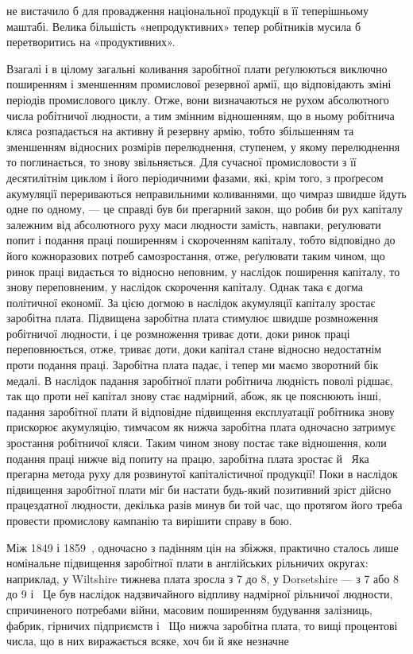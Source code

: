 \parcont{}  %
не вистачило б для провадження національної продукції в її
теперішньому маштабі. Велика більшість «непродуктивних»
тепер робітників мусила б перетворитись на «продуктивних».

Взагалі і в цілому загальні коливання заробітної плати реґулюються
виключно поширенням і зменшенням промислової резервної
армії, що відповідають зміні періодів промислового циклу.
Отже, вони визначаються не рухом абсолютного числа робітничої
людности, а тим змінним відношенням, що в ньому робітнича кляса
розпадається на активну й резервну армію, тобто збільшенням
та зменшенням відносних розмірів перелюднення, ступенем, у
якому перелюднення то поглинається, то знову звільняється.
Для сучасної промисловости з її десятилітнім циклом і його періодичними
фазами, які, крім того, з проґресом акумуляції перериваються
неправильними коливаннями, що чимраз швидше йдуть
одне по одному, — це справді був би прегарний закон, що робив
би рух капіталу залежним від абсолютного руху маси людности
замість, навпаки, реґулювати попит і подання праці поширенням
і скороченням капіталу, тобто відповідно до його кожноразових
потреб самозростання, отже, реґулювати таким чином,
що ринок праці видається то відносно неповним, у наслідок
поширення капіталу, то знову переповненим, у наслідок скорочення
капіталу. Однак така є догма політичної економії. За цією
догмою в наслідок акумуляції капіталу зростає заробітна плата.
Підвищена заробітна плата стимулює швидше розмноження робітничої
людности, і це розмноження триває доти, доки ринок
праці переповнюється, отже, триває доти, доки капітал стане
відносно недостатнім проти подання праці. Заробітна плата падає,
і тепер ми маємо зворотний бік медалі. В наслідок падання
заробітної плати робітнича людність поволі рідшає, так що проти
неї капітал знову стає надмірний, абож, як це пояснюють інші,
падання заробітної плати й відповідне підвищення експлуатації
робітника знову прискорює акумуляцію, тимчасом як нижча
заробітна плата одночасно затримує зростання робітничої кляси.
Таким чином знову постає таке відношення, коли подання праці
нижче від попиту на працю, заробітна плата зростає й~
Яка прегарна метода руху для розвинутої капіталістичної продукції!
Поки в наслідок підвищення заробітної плати міг би
настати будь-який позитивний зріст дійсно працездатної людности,
декілька разів минув би той час, що протягом його треба
провести промислову кампанію та вирішити справу в бою.

Між 1849 і 1859~, одночасно з падінням цін на збіжжя,
практично сталось лише номінальне підвищення заробітної
плати в англійських рільничих округах: наприклад, у Wiltshire
тижнева плата зросла з 7 до 8, у Dorsetshire — з 7 або
8 до 9 і~ Це був наслідок надзвичайного
відпливу надмірної рільничої людности, спричиненого потребами
війни, масовим поширенням будування залізниць, фабрик, гірничих
підприємств і~ Що нижча заробітна плата, то вищі процентові
числа, що в них виражається всяке, хоч би й яке незначне
\parbreak{}  %
